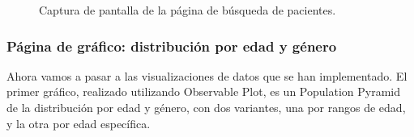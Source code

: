 \begin{figure}[H]
  \centering
  \caption{Captura de pantalla de la página de búsqueda de pacientes.}
  \label{fig:search}
\end{figure}

\subsubsection{Página de gráfico: distribución por edad y género}

Ahora vamos a pasar a las visualizaciones de datos que se han implementado. El primer gráfico, realizado utilizando Observable Plot, es un Population Pyramid \cite{populationPyramid} de la distribución por edad y género, con dos variantes, una por rangos de edad, y la otra por edad específica.


